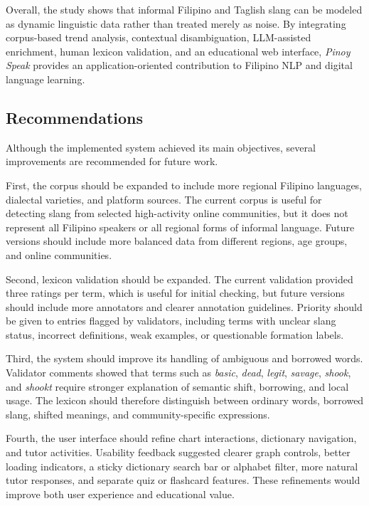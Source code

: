 Overall, the study shows that informal Filipino and Taglish slang can be modeled as dynamic linguistic data rather than treated merely as noise. By integrating corpus-based trend analysis, contextual disambiguation, LLM-assisted enrichment, human lexicon validation, and an educational web interface, \textit{Pinoy Speak} provides an application-oriented contribution to Filipino NLP and digital language learning.

\subsection{Recommendations}
Although the implemented system achieved its main objectives, several improvements are recommended for future work.

First, the corpus should be expanded to include more regional Filipino languages, dialectal varieties, and platform sources. The current corpus is useful for detecting slang from selected high-activity online communities, but it does not represent all Filipino speakers or all regional forms of informal language. Future versions should include more balanced data from different regions, age groups, and online communities.

Second, lexicon validation should be expanded. The current validation provided three ratings per term, which is useful for initial checking, but future versions should include more annotators and clearer annotation guidelines. Priority should be given to entries flagged by validators, including terms with unclear slang status, incorrect definitions, weak examples, or questionable formation labels.

Third, the system should improve its handling of ambiguous and borrowed words. Validator comments showed that terms such as \textit{basic}, \textit{dead}, \textit{legit}, \textit{savage}, \textit{shook}, and \textit{shookt} require stronger explanation of semantic shift, borrowing, and local usage. The lexicon should therefore distinguish between ordinary words, borrowed slang, shifted meanings, and community-specific expressions.

Fourth, the user interface should refine chart interactions, dictionary navigation, and tutor activities. Usability feedback suggested clearer graph controls, better loading indicators, a sticky dictionary search bar or alphabet filter, more natural tutor responses, and separate quiz or flashcard features. These refinements would improve both user experience and educational value.

